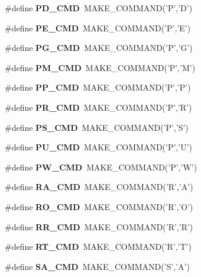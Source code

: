 \begin{DoxyCompactItemize}
\item 
\#define {\bfseries PD\_\-CMD}~MAKE\_\-COMMAND('P','D')\label{hpgsreader_8h_a80eea1f2d09c86c872c653954e4938a7}

\item 
\#define {\bfseries PE\_\-CMD}~MAKE\_\-COMMAND('P','E')\label{hpgsreader_8h_a0a538e2c30620231a95370799cd4ab4b}

\item 
\#define {\bfseries PG\_\-CMD}~MAKE\_\-COMMAND('P','G')\label{hpgsreader_8h_a102e68acd6bb5dff13c825c0e101a2f3}

\item 
\#define {\bfseries PM\_\-CMD}~MAKE\_\-COMMAND('P','M')\label{hpgsreader_8h_a95fcd2cfa1a40a390a5bfd826d26ac25}

\item 
\#define {\bfseries PP\_\-CMD}~MAKE\_\-COMMAND('P','P')\label{hpgsreader_8h_a2ebc61f0172c255c1464ed7c06ced098}

\item 
\#define {\bfseries PR\_\-CMD}~MAKE\_\-COMMAND('P','R')\label{hpgsreader_8h_a137f6a61101d5af0e0dba26cf3294612}

\item 
\#define {\bfseries PS\_\-CMD}~MAKE\_\-COMMAND('P','S')\label{hpgsreader_8h_a2d4f3a70b40cf9ead0003ca419fd126a}

\item 
\#define {\bfseries PU\_\-CMD}~MAKE\_\-COMMAND('P','U')\label{hpgsreader_8h_a97b148aa6ce573869dc6da7ffc1ecfa3}

\item 
\#define {\bfseries PW\_\-CMD}~MAKE\_\-COMMAND('P','W')\label{hpgsreader_8h_a253009341e396cb3a0493b421062ebbc}

\item 
\#define {\bfseries RA\_\-CMD}~MAKE\_\-COMMAND('R','A')\label{hpgsreader_8h_a2d8f0924de536036e8877a98f29c3eb1}

\item 
\#define {\bfseries RO\_\-CMD}~MAKE\_\-COMMAND('R','O')\label{hpgsreader_8h_aa22584e5191b9ab756f5132ab9f40456}

\item 
\#define {\bfseries RR\_\-CMD}~MAKE\_\-COMMAND('R','R')\label{hpgsreader_8h_adec0cb8774ef6940e9ef34954096d27b}

\item 
\#define {\bfseries RT\_\-CMD}~MAKE\_\-COMMAND('R','T')\label{hpgsreader_8h_a43b6a795fcb6f9acfac38611905d16f6}

\item 
\#define {\bfseries SA\_\-CMD}~MAKE\_\-COMMAND('S','A')\label{hpgsreader_8h_a94c09df58c465f0e6f2e7d0095a7528a}


\end{DoxyCompactItemize}
